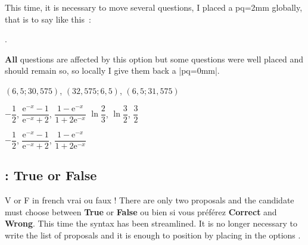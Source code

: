 This time, it is necessary to move several questions, I placed a pq=2mm globally, that is to say like this~:

. 

\textbf{All} questions are affected by this option but some questions were well placed and should remain so, so locally I give them back a |pq=0mm|.

\medskip
\begin{alterqcm}[lq=85mm,pq=2mm]
{{$(6,5;30,575)$},
{$(32,575 ; 6,5)$},
{$(6,5 ; 31,575)$}}

{{$-\dfrac{1}{2}$},
{$\dfrac{\text{e}^{-x} - 1}{\text{e}^{-x} + 2}$},
{$\dfrac{1 - \text{e}^{-x}}{1 + 2\text{e}^{-x}}$}
}
{{$\ln \dfrac{2}{3}$},
{$\ln \dfrac{3}{2}$},
{$\dfrac{3}{2}$}
}
\end{alterqcm}

\begin{tkzexample}
 \begin{alterqcm}[lq=85mm,pq=2mm]
 {{$-\dfrac{1}{2}$},
 {$\dfrac{\text{e}^{-x} - 1}{\text{e}^{-x} + 2}$},
 {$\dfrac{1 - \text{e}^{-x}}{1 + 2\text{e}^{-x}}$}}
 \end{alterqcm}
\end{tkzexample}


\subsection{ : True or False}
V or F in french vrai ou faux !
There are only two proposals and the candidate must choose between \textbf{True} or \textbf{False} ou bien si vous préférez \textbf{Correct} and \textbf{Wrong}. This time the syntax has been streamlined. It is no longer necessary to write the list of proposals and it is enough to position  by placing in the options .

